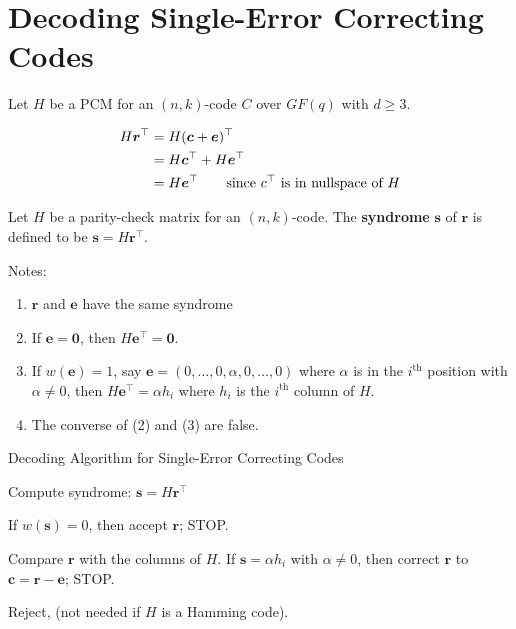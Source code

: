 \section{Decoding Single-Error Correcting Codes}
Let $ H $ be a PCM for an $ (n,k) $-code $ C $ over $ GF(q) $
with $ d\geqslant 3 $.

\begin{align*}
    H\bm{r}^\top
    &=H(\bm{c}+\bm{e})^\top\\
    &=H\bm{c}^\top+H \bm{e}^\top\\ 
    &=H\bm{e}^\top \qquad\text{since $ c^\top $ is in nullspace of }H
\end{align*}

\begin{defbox}
    \begin{definition}
        Let $ H $ be a parity-check matrix for an $ (n,k) $-code.
        The \textbf{syndrome} $ \bm{s} $ of $ \bm{r} $
        is defined to be $ \bm{s}=H\bm{r}^\top $.
    \end{definition}
\end{defbox}

Notes:
\begin{enumerate}[(1)]
    \item $ \bm{r} $ and $ \bm{e} $ have the same syndrome
    \item If $ \bm{e}=\bm{0} $, then $ H\bm{e}^\top=\bm{0} $.
    \item If $ w(\bm{e})=1 $, say $ \bm{e}=(0,\ldots,0,\alpha,0,\ldots,0) $
    where $ \alpha $ is in the $ i^{\text{th}} $ position with $ \alpha \neq 0 $,
    then $ H\bm{e}^\top=\alpha h_i $ where $ h_i $ is the $ i^{\text{th}} $
    column of $ H $.
    \item The converse of (2) and (3) are false.
\end{enumerate}

\begin{algbox}
    \begin{algorithm}[H]
        \caption{Decoding Algorithm for Single-Error Correcting Codes}
        Compute syndrome: $ \bm{s}=H\bm{r}^\top $

        If $ w(\bm{s})=0 $, then accept $ \bm{r} $; STOP.

        Compare $ \bm{r} $ with the columns of $ H $. If $ \bm{s}=\alpha h_i $
        with $ \alpha\neq 0 $, then correct $ \bm{r} $ to
        $ \bm{c}=\bm{r}-\bm{e} $; STOP.

        Reject, (not needed if $ H $ is a Hamming code).
    \end{algorithm}
\end{algbox}

